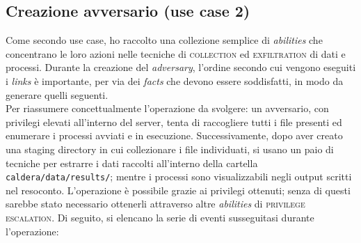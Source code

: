    \subsection{Creazione avversario (use case 2)}
    Come secondo use case, ho raccolto una collezione semplice di \textit{abilities} che concentrano le loro azioni nelle tecniche di \textsc{collection} ed \textsc{exfiltration} di dati e processi. Durante la creazione del \textit{adversary}, l'ordine secondo cui vengono eseguiti i \textit{links} è importante, per via dei \textit{facts} che devono essere soddisfatti, in modo da generare quelli seguenti.\\
    Per riassumere concettualmente l'operazione da svolgere: un avversario, con privilegi elevati all'interno del server, tenta di raccogliere tutti i file presenti ed enumerare i processi avviati e in esecuzione. Successivamente, dopo aver creato una staging directory in cui collezionare i file individuati, si usano un paio di tecniche per estrarre i dati raccolti all'interno della cartella \texttt{caldera/data/results/}; mentre i processi sono visualizzabili negli output scritti nel resoconto. L'operazione è possibile grazie ai privilegi ottenuti; senza di questi sarebbe stato necessario ottenerli attraverso altre \textit{abilities} di \textsc{privilege escalation}. Di seguito, si elencano la serie di eventi susseguitasi durante l'operazione:
